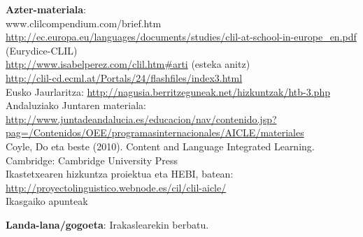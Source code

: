\documentclass[
]{book}
\begin{document}
\textbf{Azter-materiala}:\\
www.clilcompendium.com/brief.htm\\
\url{http://ec.europa.eu/languages/documents/studies/clil-at-school-in-europe_en.pdf} (Eurydice-CLIL)\\
\url{http://www.isabelperez.com/clil.htm\#arti} (esteka anitz)\\
\url{http://clil-cd.ecml.at/Portals/24/flashfiles/index3.html}~\\
Eusko Jaurlaritza: \url{http://nagusia.berritzeguneak.net/hizkuntzak/htb-3.php}\\
Andaluziako Juntaren materiala: \url{http://www.juntadeandalucia.es/educacion/nav/contenido.jsp?pag=/Contenidos/OEE/programasinternacionales/AICLE/materiales}\\
Coyle, Do eta beste (2010). Content and Language Integrated Learning. Cambridge: Cambridge University Press\\
Ikastetxearen hizkuntza proiektua eta HEBI, batean: \url{http://proyectolinguistico.webnode.es/cil/clil-aicle/}\\
Ikasgaiko apunteak

\textbf{Landa-lana/gogoeta}: Irakaslearekin berbatu.
\end{document}
